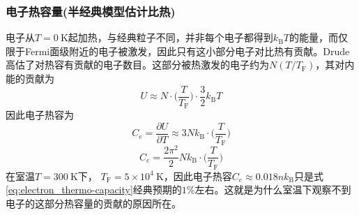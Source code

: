 \subsubsection{电子热容量(半经典模型估计比热)}
电子从$T=0~\mathrm{K}$起加热，与经典粒子不同，并非每个电子都得到$k_{\mathrm{B}}T$的能量，而仅限于Fermi面级附近的电子被激发，因此只有这小部分电子对比热有贡献。Drude高估了对热容有贡献的电子数目。这部分被热激发的电子约为$N(T/T_{\mathrm{F}})$，其对内能的贡献为
\begin{equation}
	U\approx N\cdot\bigg(\dfrac{T}{T_{\mathrm{F}}}\bigg)\cdot\dfrac32k_{\mathrm{B}}T
	\label{eq:electron-thermo-U}
\end{equation}
因此电子热容为
\begin{equation}
	C_e=\dfrac{\partial U}{\partial T}\approx3Nk_{\mathrm{B}}\cdot\bigg(\dfrac{T}{T_{\mathrm{F}}}\bigg)
	\label{eq:electron-thermo-capacity-approx}
\end{equation} 
\begin{equation}
	C_e=\dfrac{2\pi^2}2Nk_{\mathrm{B}}\cdot\bigg(\dfrac{T}{T_{\mathrm{F}}}\bigg)
	\label{eq:electron-thermo-capacity}
\end{equation}
在室温$T=300~\mathrm{K}$下， $T_{\mathrm{F}}=5\times10^4~\mathrm{K}$，因此电子热容$C_e\approx0.018nk_{\mathrm{B}}$只是式\eqref{eq:electron_thermo-capacity}经典预期的$1\%$左右。这就是为什么室温下观察不到电子的这部分热容量的贡献的原因所在。

